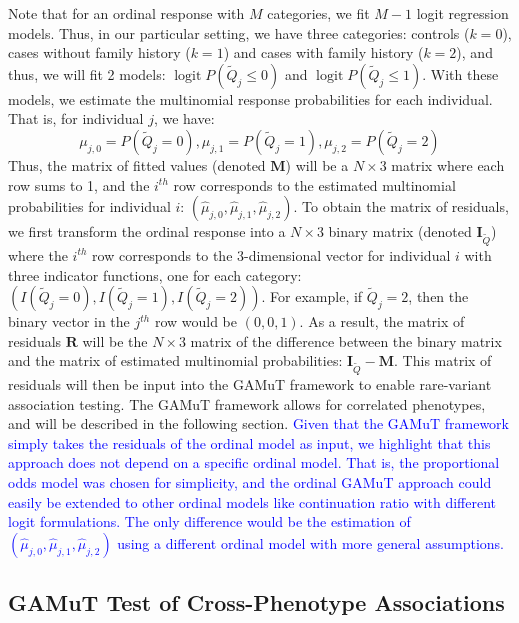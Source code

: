 \documentclass[]{article}
\DeclareMathOperator{\logit}{logit}
\begin{document}
Note that for an ordinal response with \(M\) categories, we fit \(M-1\)
logit regression models. Thus, in our particular setting, we have three
categories: controls (\(k=0\)), cases without family history (\(k=1\))
and cases with family history (\(k=2\)), and thus, we will fit 2 models:
\(\logit P(\tilde{Q}_j \leq 0)\) and \(\logit P(\tilde{Q}_j \leq 1)\).
With these models, we estimate the multinomial response probabilities
for each individual. That is, for individual \(j\), we have: \[
\mu_{j,0} = P(\tilde{Q}_j=0),
\mu_{j,1} = P(\tilde{Q}_j=1),
\mu_{j,2} = P(\tilde{Q}_j=2)
\] Thus, the matrix of fitted values (denoted \(\mathbf{M}\)) will be a
\(N \times 3\) matrix where each row sums to 1, and the \(i^{th}\) row
corresponds to the estimated multinomial probabilities for individual
\(i\): \((\hat{\mu}_{j,0},\hat{\mu}_{j,1},\hat{\mu}_{j,2})\). To obtain
the matrix of residuals, we first transform the ordinal response into a
\(N \times 3\) binary matrix (denoted \(\mathbf{I}_{\tilde{Q}}\)) where
the \(i^{th}\) row corresponds to the 3-dimensional vector for
individual \(i\) with three indicator functions, one for each category:
\((I(\tilde{Q}_j=0), I(\tilde{Q}_j=1), I(\tilde{Q}_j=2))\). For example,
if \(\tilde{Q}_j=2\), then the binary vector in the \(j^{th}\) row would
be \((0,0,1)\). As a result, the matrix of residuals \(\mathbf{R}\) will
be the \(N \times 3\) matrix of the difference between the binary matrix
and the matrix of estimated multinomial probabilities:
\(\mathbf{I}_{\tilde{Q}}-\mathbf{M}\). This matrix of residuals will
then be input into the GAMuT framework to enable rare-variant
association testing. The GAMuT framework allows for correlated
phenotypes, and will be described in the following section.
\textcolor{blue}{Given that the GAMuT framework simply takes the residuals of the ordinal model as input, we highlight that this approach does not depend on a specific ordinal model. That is, 
the proportional odds model was chosen for simplicity, and the ordinal GAMuT approach could easily be extended to other ordinal models like continuation ratio with different logit formulations. The only difference would be the estimation of $(\hat{\mu}_{j,0},\hat{\mu}_{j,1},\hat{\mu}_{j,2})$ using a different ordinal model with more general assumptions.}

\hypertarget{gamut-test-of-cross-phenotype-associations}{%
\subsection{GAMuT Test of Cross-Phenotype
Associations}\label{gamut-test-of-cross-phenotype-associations}}
\end{document}
